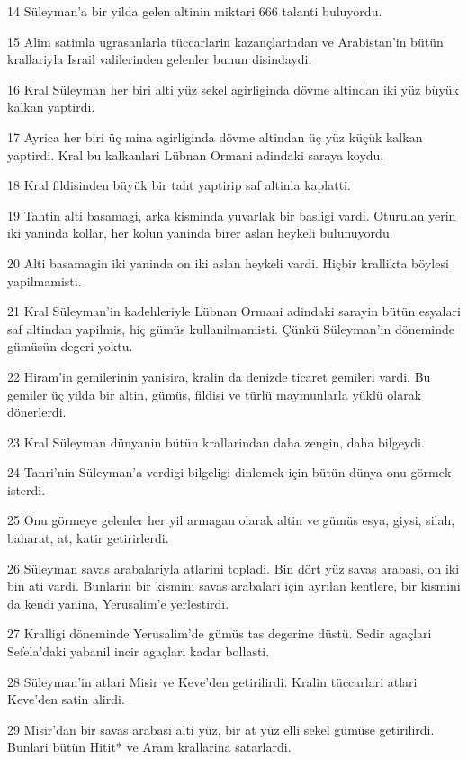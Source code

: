 \par 14 Süleyman'a bir yilda gelen altinin miktari 666 talanti buluyordu.
\par 15 Alim satimla ugrasanlarla tüccarlarin kazançlarindan ve Arabistan'in bütün krallariyla Israil valilerinden gelenler bunun disindaydi.
\par 16 Kral Süleyman her biri alti yüz sekel agirliginda dövme altindan iki yüz büyük kalkan yaptirdi.
\par 17 Ayrica her biri üç mina agirliginda dövme altindan üç yüz küçük kalkan yaptirdi. Kral bu kalkanlari Lübnan Ormani adindaki saraya koydu.
\par 18 Kral fildisinden büyük bir taht yaptirip saf altinla kaplatti.
\par 19 Tahtin alti basamagi, arka kisminda yuvarlak bir basligi vardi. Oturulan yerin iki yaninda kollar, her kolun yaninda birer aslan heykeli bulunuyordu.
\par 20 Alti basamagin iki yaninda on iki aslan heykeli vardi. Hiçbir krallikta böylesi yapilmamisti.
\par 21 Kral Süleyman'in kadehleriyle Lübnan Ormani adindaki sarayin bütün esyalari saf altindan yapilmis, hiç gümüs kullanilmamisti. Çünkü Süleyman'in döneminde gümüsün degeri yoktu.
\par 22 Hiram'in gemilerinin yanisira, kralin da denizde ticaret gemileri vardi. Bu gemiler üç yilda bir altin, gümüs, fildisi ve türlü maymunlarla yüklü olarak dönerlerdi.
\par 23 Kral Süleyman dünyanin bütün krallarindan daha zengin, daha bilgeydi.
\par 24 Tanri'nin Süleyman'a verdigi bilgeligi dinlemek için bütün dünya onu görmek isterdi.
\par 25 Onu görmeye gelenler her yil armagan olarak altin ve gümüs esya, giysi, silah, baharat, at, katir getirirlerdi.
\par 26 Süleyman savas arabalariyla atlarini topladi. Bin dört yüz savas arabasi, on iki bin ati vardi. Bunlarin bir kismini savas arabalari için ayrilan kentlere, bir kismini da kendi yanina, Yerusalim'e yerlestirdi.
\par 27 Kralligi döneminde Yerusalim'de gümüs tas degerine düstü. Sedir agaçlari Sefela'daki yabanil incir agaçlari kadar bollasti.
\par 28 Süleyman'in atlari Misir ve Keve'den getirilirdi. Kralin tüccarlari atlari Keve'den satin alirdi.
\par 29 Misir'dan bir savas arabasi alti yüz, bir at yüz elli sekel gümüse getirilirdi. Bunlari bütün Hitit* ve Aram krallarina satarlardi.

